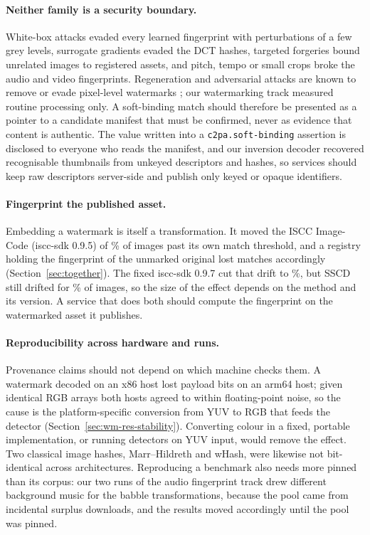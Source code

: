 \paragraph{Neither family is a security boundary.} White-box attacks evaded every learned fingerprint with perturbations of a few grey levels, surrogate gradients evaded the DCT hashes, targeted forgeries bound unrelated images to registered assets, and pitch, tempo or small crops broke the audio and video fingerprints. Regeneration and adversarial attacks are known to remove or evade pixel-level watermarks \cite{zhao2024removable, jiang2023evading}; our watermarking track measured routine processing only. A soft-binding match should therefore be presented as a pointer to a candidate manifest that must be confirmed, never as evidence that content is authentic. The value written into a \texttt{c2pa.soft-binding} assertion is disclosed to everyone who reads the manifest, and our inversion decoder recovered recognisable thumbnails from unkeyed descriptors and hashes, so services should keep raw descriptors server-side and publish only keyed or opaque identifiers.

\paragraph{Fingerprint the published asset.} Embedding a watermark is itself a transformation. It moved the ISCC Image-Code (iscc-sdk 0.9.5) of \% of images past its own match threshold, and a registry holding the fingerprint of the unmarked original lost matches accordingly (Section~\ref{sec:together}). The fixed iscc-sdk 0.9.7 cut that drift to \%, but SSCD still drifted for \% of images, so the size of the effect depends on the method and its version. A service that does both should compute the fingerprint on the watermarked asset it publishes.

\paragraph{Reproducibility across hardware and runs.} Provenance claims should not depend on which machine checks them. A watermark decoded on an x86 host lost payload bits on an arm64 host; given identical RGB arrays both hosts agreed to within floating-point noise, so the cause is the platform-specific conversion from YUV to RGB that feeds the detector (Section~\ref{sec:wm-res-stability}). Converting colour in a fixed, portable implementation, or running detectors on YUV input, would remove the effect. Two classical image hashes, Marr--Hildreth and wHash, were likewise not bit-identical across architectures. Reproducing a benchmark also needs more pinned than its corpus: our two runs of the audio fingerprint track drew different background music for the babble transformations, because the pool came from incidental surplus downloads, and the results moved accordingly until the pool was pinned.


